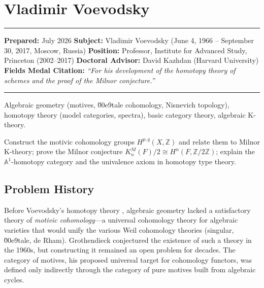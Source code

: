 \chapter{Vladimir Voevodsky}\label{ch2002vladimirvoevodsky:vladimir-voevodsky-fields-medal-2002-a-comprehensive-report-on-his-work-and-impact}

\begin{center}\rule{0.5\linewidth}{0.5pt}\end{center}

\textbf{Prepared:} July 2026 \textbf{Subject:} Vladimir Voevodsky (June 4, 1966 -- September 30, 2017, Moscow, Russia) \textbf{Position:} Professor, Institute for Advanced Study, Princeton (2002--2017) \textbf{Doctoral Advisor:} David Kazhdan (Harvard University) \textbf{Fields Medal Citation:} \emph{``For his development of the homotopy theory of schemes and the proof of the Milnor conjecture.''}

\begin{center}\rule{0.5\linewidth}{0.5pt}\end{center}

\begin{prereqs} Algebraic geometry (motives, \u00e9tale cohomology, Nisnevich topology), homotopy theory (model categories, spectra), basic category theory, algebraic K-theory. \end{prereqs}

\begin{objectives} Construct the motivic cohomology groups $H^{p,q}(X, \mathbb{Z})$ and relate them to Milnor K-theory; prove the Milnor conjecture $K^M_n(F)/2 \cong H^n(F, \mathbb{Z}/2\mathbb{Z})$; explain the $\mathbb{A}^1$-homotopy category and the univalence axiom in homotopy type theory. \end{objectives}

\section{Problem History}

Before Voevodsky's homotopy theory \cite{voevodsky2002}, algebraic geometry lacked a satisfactory theory of \emph{motivic cohomology}---a universal cohomology theory for algebraic varieties that would unify the various Weil cohomology theories (singular, \u00e9tale, de Rham). Grothendieck conjectured the existence of such a theory in the 1960s, but constructing it remained an open problem for decades. The category of motives, his proposed universal target for cohomology functors, was defined only indirectly through the category of pure motives built from algebraic cycles.

